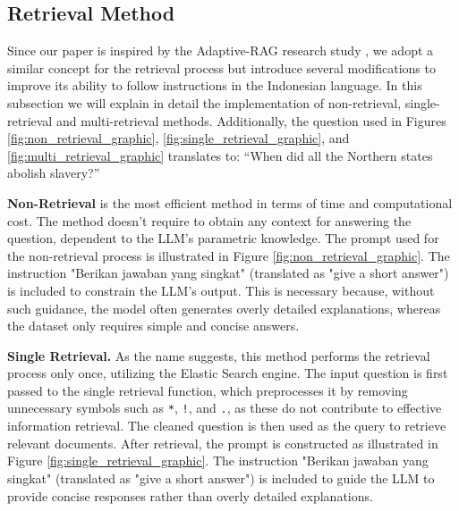 \documentclass[times]{iapress}
\begin{document}
\subsection{Retrieval Method}
Since our paper is inspired by the Adaptive-RAG research study \cite{adaptive_rag}, we adopt a similar concept for the retrieval process but introduce several modifications to improve its ability to follow instructions in the Indonesian language. In this subsection we will explain in detail the implementation of non-retrieval, single-retrieval and multi-retrieval methods. Additionally, the question used in Figures \ref{fig:non_retrieval_graphic}, \ref{fig:single_retrieval_graphic}, and \ref{fig:multi_retrieval_graphic} translates to: “When did all the Northern states abolish slavery?”

\textbf{Non-Retrieval} is the most efficient method in terms of time and computational cost. The method doesn't require to obtain any context for answering the question, dependent to the LLM's parametric knowledge. The prompt used for the non-retrieval process is illustrated in Figure \ref{fig:non_retrieval_graphic}. The instruction "Berikan jawaban yang singkat" (translated as "give a short answer") is included to constrain the LLM’s output. This is necessary because, without such guidance, the model often generates overly detailed explanations, whereas the dataset only requires simple and concise answers.


\textbf{Single Retrieval.} As the name suggests, this method performs the retrieval process only once, utilizing the Elastic Search engine. The input question is first passed to the single retrieval function, which preprocesses it by removing unnecessary symbols such as \texttt{*}, \texttt{!}, and \texttt{.}, as these do not contribute to effective information retrieval. The cleaned question is then used as the query to retrieve relevant documents. After retrieval, the prompt is constructed as illustrated in Figure \ref{fig:single_retrieval_graphic}. The instruction "Berikan jawaban yang singkat" (translated as "give a short answer") is included to guide the LLM to provide concise responses rather than overly detailed explanations.
\end{document}
